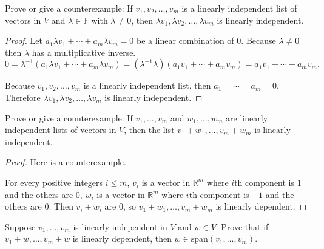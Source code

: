 \begin{exercise}
    Prove or give a counterexample: If $v_{1}, v_{2}, \ldots, v_{m}$ is a linearly independent list of vectors in $V$ and $\lambda\in\mathbb{F}$ with $\lambda\ne 0$, then $\lambda v_{1}, \lambda v_{2}, \ldots, \lambda v_{m}$ is linearly independent.
\end{exercise}

\begin{proof}
    Let $a_{1}\lambda v_{1} + \cdots + a_{m}\lambda v_{m} = 0$ be a linear combination of $0$. Because $\lambda\ne 0$ then $\lambda$ has a multiplicative inverse.
    \[
        0 = \lambda^{-1}(a_{1}\lambda v_{1} + \cdots + a_{m}\lambda v_{m}) = (\lambda^{-1}\lambda)(a_{1}v_{1} + \cdots + a_{m}v_{m}) = a_{1}v_{1} + \cdots + a_{m}v_{m}.
    \]

    Because $v_{1}, v_{2}, \ldots, v_{m}$ is a linearly independent list, then $a_{1} = \cdots = a_{m} = 0$. Therefore $\lambda v_{1}, \lambda v_{2}, \ldots, \lambda v_{m}$ is linearly independent.
\end{proof}

\begin{exercise}
    Prove or give a counterexample: If $v_{1}, \ldots, v_{m}$ and $w_{1}, \ldots, w_{m}$ are linearly independent lists of vectors in $V$, then the list $v_{1} + w_{1}, \ldots, v_{m} + w_{m}$ is linearly independent.
\end{exercise}

\begin{proof}
    Here is a counterexample.

    For every positive integers $i\leq m$, $v_{i}$ is a vector in $\mathbb{R}^{m}$ where $i$th component is $1$ and the others are $0$, $w_{i}$ is a vector in $\mathbb{R}^{m}$ where $i$th component is $-1$ and the others are $0$. Then $v_{i} + w_{i}$ are $0$, so $v_{1} + w_{1}, \ldots, v_{m} + w_{m}$ is linearly dependent.
\end{proof}

\begin{exercise}
    Suppose $v_{1}, \ldots, v_{m}$ is linearly independent in $V$ and $w\in V$. Prove that if $v_{1} + w, \ldots, v_{m} + w$ is linearly dependent, then $w\in \text{span}(v_{1}, \ldots, v_{m})$.
\end{exercise}

